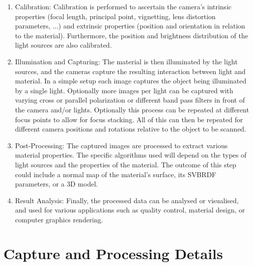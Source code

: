 \documentclass[11pt, twoside, listof=totocnumbered, bibliography=totocnumbered]{scrartcl}
\begin{document}
\begin{enumerate}
	\item Calibration: Calibration is performed to ascertain the camera's intrinsic properties (focal length, principal point, vignetting, lens distortion parameters, ...) and extrinsic properties (position and orientation in relation to the material). Furthermore, the position and brightness distribution of the light sources are also calibrated.
	\item Illumination and Capturing: The material is then illuminated by the light sources, and the cameras capture the resulting interaction between light and material. In a simple setup each image captures the object being illuminated by a single light. Optionally more images per light can be captured with varying cross or parallel polarization or different band pass filters in front of the camera and/or lights. Optionally this process can be repeated at different focus points to allow for focus stacking. All of this can then be repeated for different camera positions and rotations relative to the object to be scanned.
	\item Post-Processing: The captured images are processed to extract various material properties. The specific algorithms used will depend on the types of light sources and the properties of the material. The outcome of this step could include a normal map of the material's surface, its SVBRDF parameters, or a 3D model.
	\item Result Analysis: Finally, the processed data can be analysed or visualised, and used for various applications such as quality control, material design, or computer graphics rendering.
\end{enumerate}

\section{Capture and Processing Details}
\end{document}
